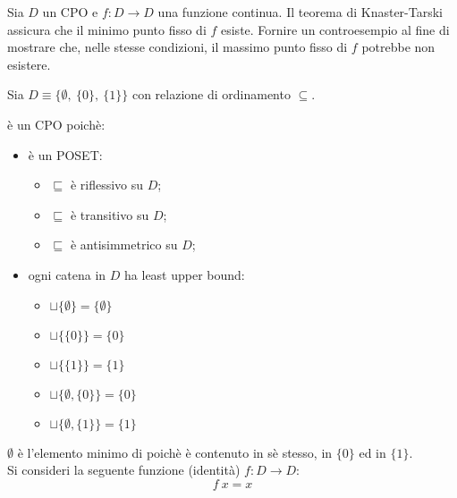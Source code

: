 \newcommand{\lt}{\ensuremath{\sqsubseteq}}

{
  Sia $D$ un CPO e $f: D \to D$ una funzione continua. Il teorema di
  Knaster-Tarski assicura che il minimo punto fisso di $f$ esiste.
  Fornire un controesempio al fine di mostrare che, nelle stesse condizioni, il
  massimo punto fisso di $f$ potrebbe non esistere.
}
{
}

Sia $D \equiv \{\emptyset,\ \{0\},\ \{1\}\}$ con relazione di ordinamento
$\subseteq$.

 è un CPO poichè:
\begin{itemize}
  \item {} è un POSET:
  \begin{itemize}
    \item $\sqsubseteq$ è riflessivo su $D$;
    \item $\sqsubseteq$ è transitivo su $D$;
    \item $\sqsubseteq$ è antisimmetrico su $D$;
  \end{itemize}
  \item ogni catena in $D$ ha least upper bound:
  \begin{itemize}
    \item $\sqcup\{\emptyset\} = \{\emptyset\}$
    \item $\sqcup\{\{0\}\} = \{0\}$
    \item $\sqcup\{\{1\}\} = \{1\}$
    \item $\sqcup\{\emptyset, \{0\}\} = \{0\}$
    \item $\sqcup\{\emptyset, \{1\}\} = \{1\}$
  \end{itemize}
\end{itemize}

$\emptyset$ è l'elemento minimo di  poichè
è contenuto in sè stesso, in $\{0\}$ ed in $\{1\}$.
\\
Si consideri la seguente funzione (identità) $f: D \to D$:
$$
f\ x = x
$$

